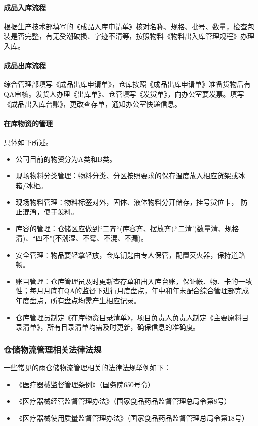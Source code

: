 \paragraph{成品入库流程} 根据生产技术部填写的《成品入库申请单》核对名称、规格、批号、数量，检查包装是否完整，有无受潮破损、字迹不清等，按照物料《物料出入库管理规程》办理入库。

\paragraph{成品出库流程} 综合管理部填写《成品出库申请单》，仓库按照《成品出库申请单》准备货物后有QA审核。发货人办理《出库单》、仓管填写《发货单》，向办公室要发票。填写《成品出入库台账》，更改查存单，通知办公室快递信息。

\paragraph{在库物资的管理} 具体如下所述。
\begin{itemize}
    \item 公司目前的物资分为A类和B类。
    \item 现场物料分类管理：物料分类、分区按照要求的保存温度放入相应货架或冰箱/冰柜。
    \item 现场物料管理：物料标签对外，固体、液体物料分开储存，挂号货位卡， 防止混淆，便于发料。
    \item 库容的管理：仓储区应做到“二齐“(库容齐、摆放齐).“二清"(数量清、规格清)、“四不"(不潮湿、不霉、不混、不漏)。
    \item 安全管理：物品要轻拿轻放，仓库钥匙由专人保管，配置灭火器，保持道路畅。
    \item 账目管理：仓库管理员及时更新查存单和出入库台账，保证帐、物、卡的一致性；每月月底在QA的监督下进行月度盘点，年中和年末配合综合管理部完成年度盘点，所有盘点均需产生相应记录。
    \item 仓库管理员制定《在库物资目录清单》，项目负责人负责人制定《主要原料目录清单》，所有目录清单均需及时更新，确保信息的准确度。
\end{itemize}

\subsubsection{仓储物流管理相关法律法规}
一些常见的雨仓储物流管理相关的法律法规举例如下：
\begin{itemize}
    \item 《医疗器械监督管理条例》（国务院650号令）
    \item 《医疗器械经营监督管理办法》（国家食品药品监督管理总局令第8号）
    \item 《医疗器械使用质量监督管理办法》（国家食品药品监督管理总局令第18号）
\end{itemize}

